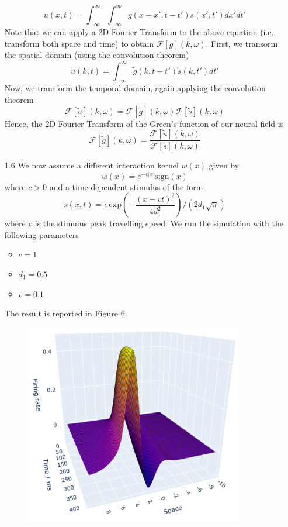 \documentclass[12pt]{article}
\begin{document}
\begin{enumerate}
 \[
    u(x, t) = \int_{-\infty}^{\infty} \int_{-\infty}^{\infty} g(x-x', t-t')s(x', t')dx'dt'
 \]
Note that we can apply a 2D Fourier Transform to the above equation (i.e. transform both space and time) to obtain $\mathcal{F}[g](k, \omega)$.
First, we transorm the spatial domain (using the convolution theorem)
\[
    \widetilde{u}(k, t) = \int_{-\infty}^{\infty} \widetilde{g}(k, t-t')\widetilde{s}(k, t')dt'
\]
Now, we transform the temporal domain, again applying the convolution theorem
\[
    \mathcal{F}[\tilde{u}](k, \omega) = \mathcal{F}[\tilde{g}](k, \omega)\mathcal{F}[\tilde{s}](k, \omega)
\]
Hence, the 2D Fourier Transform of the Green's function of our neural field is
\[
    \mathcal{F}[\tilde{g}](k, \omega) = \frac{\mathcal{F}[\tilde{u}](k, \omega)}{\mathcal{F}[\tilde{s}](k, \omega)}
\]
\item[1.6] We now assume a different interaction kernel $w(x)$ given by
\[
    w(x) = e^{-c|x|}\text{sign}(x)  
\] 
where $c>0$ and a time-dependent stimulus of the form
\[
    s(x, t) = c\,\text{exp}\left(-\frac{(x-vt)^{2}}{4d_{1}^{2}}\right)/(2d_{1}\sqrt{\pi})
\]
where $v$ is the stimulus peak travelling speed. We run the simulation with the following parameters
\begin{itemize}
    \item $c=1$
    \item $d_{1}=0.5$
    \item $v=0.1$
\end{itemize}
The result is reported in Figure 6.
\begin{figure}[H]
    \centering
    \includegraphics[width=0.9\textwidth]{./figure6.png}

\end{figure}
\end{enumerate}
\end{document}
